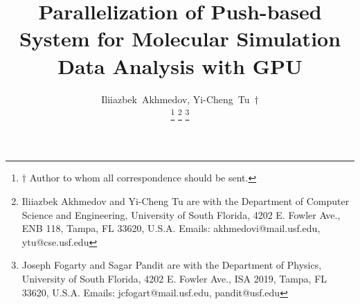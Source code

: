 \documentclass[10pt,journal,final,letterpaper,twocolumn]{IEEEtran}
\begin{document}
\title{Parallelization of Push-based System for Molecular Simulation Data Analysis with GPU}


\author{Iliiazbek~Akhmedov, Yi-Cheng~Tu~$\dagger$%

\thanks{$\dagger$ Author to whom all correspondence should be sent.}
\thanks{Iliiazbek Akhmedov and Yi-Cheng Tu are with the Department of Computer Science and Engineering, University of South Florida, 4202 E. Fowler Ave., ENB 118, Tampa, FL 33620, U.S.A. Emails:
akhmedovi@mail.usf.edu, ytu@cse.usf.edu}
\thanks{Joseph Fogarty and Sagar Pandit are with the Department of Physics,
University of South Florida, 4202 E. Fowler Ave., ISA 2019, Tampa,
FL 33620, U.S.A. Emails: jcfogart@mail.usf.edu, pandit@usf.edu} }



\maketitle
\end{document}

